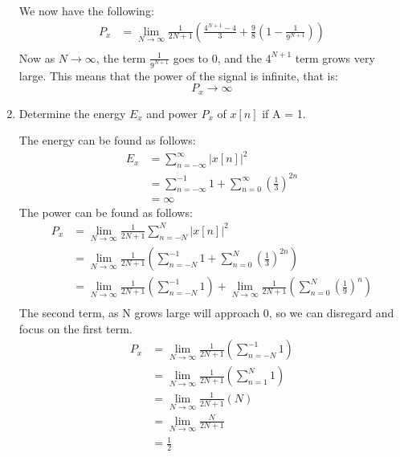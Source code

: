 \documentclass{article}
\begin{document}
\begin{enumerate}[label=\alph*.]
    We now have the following:
    \begin{align*}
        P_x &= \lim_{N \to \infty} \frac{1}{2N + 1} \left(\frac{4^{N+1} - 4}{3} + \frac{9}{8}\left(1 - \frac{1}{9^{N+1}}\right)\right) \\
    \end{align*}
    Now as $N \to \infty$, the term $\frac{1}{9^{N+1}}$ goes to 0, and the $4^{N+1}$ term grows very large. This means that the power of the signal is infinite, that is:
    \[
        P_x \rightarrow \infty
    \]
    \item Determine the energy $E_x$ and power $P_x$ of $x[n]$ if A = 1.
    
    The energy can be found as follows:
    \begin{align*}
        E_x &= \sum_{n=-\infty}^{\infty} |x[n]|^2 \\
        &= \sum_{n=-\infty}^{-1} 1 + \sum_{n=0}^{\infty} \left(\frac{1}{3}\right)^{2n} \\
        &= \infty
    \end{align*}
    The power can be found as follows:
    \begin{align*}
        P_x &= \lim_{N \to \infty} \frac{1}{2N + 1} \sum_{n=-N}^{N} |x[n]|^2 \\
        &= \lim_{N \to \infty} \frac{1}{2N + 1} \left(\sum_{n=-N}^{-1} 1 + \sum_{n=0}^{N} \left(\frac{1}{3}\right)^{2n}\right) \\
        &= \lim_{N \to \infty} \frac{1}{2N + 1} \left(\sum_{n=-N}^{-1} 1\right) + 
        \lim_{N \to \infty} \frac{1}{2N+1}\left(\sum_{n=0}^{N} \left(\frac{1}{9}\right)^{n}\right)\\
    \end{align*}
    The second term, as N grows large will approach 0, so we can disregard and focus on the first term.
    \begin{align*}
        P_x &= \lim_{N \to \infty} \frac{1}{2N + 1} \left(\sum_{n=-N}^{-1} 1\right) \\
        &= \lim_{N \to \infty} \frac{1}{2N + 1} \left(\sum_{n=1}^{N} 1\right) \\
        &= \lim_{N \to \infty} \frac{1}{2N + 1} \left(N\right) \\
        &= \lim_{N \to \infty} \frac{N}{2N + 1} \\
        &= \frac{1}{2}
    \end{align*}


\end{enumerate}
\end{document}
